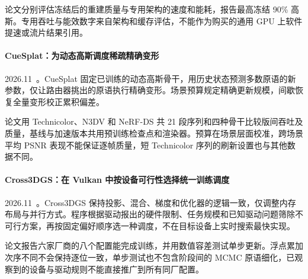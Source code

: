 论文分别评估冻结后的重建质量与专用架构的速度和能耗，报告最高冻结 90\% 高斯。专用吞吐与能效数字来自架构和缓存评估，不能作为购买的通用 GPU 上软件提速或流片结果引用。

\paragraph{CueSplat：为动态高斯调度稀疏精确变形}
2026.11~\cite{2611_22095}。CueSplat 固定已训练的动态高斯骨干，用历史状态预测多数原语的新参数，仅让路由器挑出的原语执行精确变形。场景预算规定精确更新规模，间歇恢复全量变形校正累积偏差。

论文用 Technicolor、N3DV 和 NeRF-DS 共 21 段序列和四种骨干比较版间吞吐及质量，基线与加速版本共用预训练检查点和渲染器。预算在场景层面校准，跨场景平均 PSNR 表现不能保证逐帧质量，短 Technicolor 序列的刷新设置也与其他数据不同。

\paragraph{Cross3DGS：在 Vulkan 中按设备可行性选择统一训练调度}
2026.11~\cite{2611_22240}。Cross3DGS 保持投影、混合、梯度和优化器的逻辑一致，仅调整内存布局与并行方式。程序根据驱动报出的硬件限制、任务规模和已知驱动问题筛除不可行方案，再按固定偏好顺序选一种调度，不在目标设备上实时搜索最快实现。

论文报告六家厂商的八个配置能完成训练，并用数值容差测试单步更新。浮点累加次序不同不会保持逐位一致，单步测试也不包含阶段间的 MCMC 原语细化，已观察到的设备与驱动规则不能直接推广到所有同厂配置。
